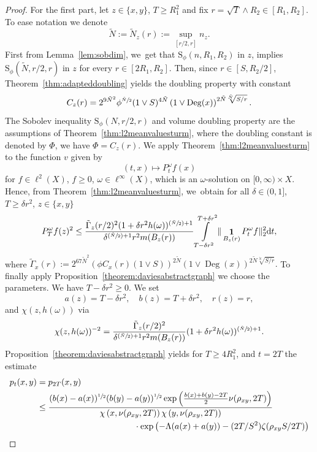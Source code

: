 \documentclass[10pt]{amsart}
\newcommand{\Psfrac}[2]{(\sfrac{#1}{#2})}
\newcommand{\rS}{\mathrm{S}}
\theoremstyle{plain}
\theoremstyle{definition}
\newcommand{\drm}{\mathrm{d}}
\DeclareMathOperator{\Deg}{Deg}
\DeclareMathOperator{\Eins}{\mathbf{1}}
\let\oldint\int
\renewcommand{\int}{\oldint\limits}
\begin{document}
\begin{proof}
For the first part, let $z\in\{x,y\}$, $ T\ge R_{1}^{2} $ and fix $ r=\sqrt{T}\wedge R_2 \in [R_{1},R_{2}] $.
To ease notation we denote
\[
\tilde N:=\tilde N_{z}(r):={\sup_{[r/2,r]}n_z.}
\]
First from Lemma~\ref{lem:sobdim}, we~get that $\rS_\phi (n,R_1,R_2)$ in $z$, implies $\rS_{\phi} (\tilde N, r/2,r)$ in $z$ for every $ r\in[2R_1,R_2] $.
Then, since $r\in[S,R_2/2]$, Theorem~\ref{thm:adapteddoubling} yields the doubling property with constant
\[
C_z(r)=2^{9 \tilde N^2}\phi^{\sfrac{\tilde N}{2}}(1\vee S)^{4\tilde N}\left(1\vee\Deg(x)\right)^{2\tilde N\sqrt[\tilde N]{S/r}}.
\]
The Sobolev inequality $\rS_{{\phi}}(N,r/2,r)$ and volume doubling property are the assumptions of Theorem~\ref{thm:l2meanvaluesturm}, where the doubling constant is denoted by $\Phi $, \ie we have $ \Phi=C_{z}(r) $. We apply Theorem~\ref{thm:l2meanvaluesturm} to the function $ v $ given by
\[
(t,x)\mapsto P^\omega_t f(x)
\]
for $f\in \ell^2(X)$, $f\geq 0$, $\omega\in\ell^\infty(X)$, which is an $\omega$-solution on $[0,\infty)\times X$. Hence, from Theorem~\ref{thm:l2meanvaluesturm}, we~obtain
for all $\delta\in(0,1]$, $T\geq \delta r^2$, $z\in\{x,y\}$
\begin{align*}
P_T^\omega f(z)^2
\leq
\frac{\tilde\Gamma_{z}(r/2)^2(1+\delta r^2h(\omega))^{\Psfrac{\tilde N}{2}+1}}{\delta^{\Psfrac{\tilde N}2+1}r^2m(B_{z}(r))}
\int\limits_{T-\delta r^2}^{T+\delta r^2}\Vert\Eins_{B_{z}(r)} P_t^\omega f\Vert_2^{2}\drm t,
\end{align*}
where $
\tilde\Gamma_x(r)
:=
2^{67\tilde N^2}(\phi C_{x}(r)(1\vee S))^{2\tilde N}
\left(1\vee\Deg(x)
\right)
^{2\tilde N\sqrt[\tilde N]{{S}/{r}}}. $
To finally apply
Proposition~\ref{theorem:daviesabstractgraph} we choose the parameters.
We have $T-\delta r^2\geq 0$. We set
\[
a(z)=T-\delta r^2,\quad b(z)=T+\delta r^2,\quad
r(z)=r,
\]
and $\chi(z, h(\omega))$ via
\[
\chi(z,h(\omega))^{-2}=\frac{\tilde\Gamma_{z} (r/2)^2}{\delta^{\Psfrac{\tilde N}2+1}r^{2}
m(B_{z}(r))}(1+\delta r^2h(\omega))^{\Psfrac{\tilde N}{2}+1}.
\]
Proposition~\ref{theorem:daviesabstractgraph} yields
for $T\geq 4R_1^2$, and $ t=2T $
the estimate
\begin{align*}
p_{t}(x,y)&=p_{2T}(x,y)
\\&
\leq \frac
{
(b(x)-a(x))^{\sfrac{1}{2}}(b(y)-a(y))^{\sfrac{1}{2}}
\exp\left(\frac{b(x)+b(y)-2T}{2}\nu(\rho_{xy},2T)\right)
}
{\chi\left(x,\nu(\rho_{xy},2T)\right)\chi\left(y,\nu(\rho_{xy},2T)\right)}
\\
&\hspace*{4cm} \cdot\exp\left(-\Lambda(a(x)+a(y))-(2T/S^2)\zeta(\rho_{xy}S/2T)\right)

\end{align*}
\end{proof}
\end{document}
